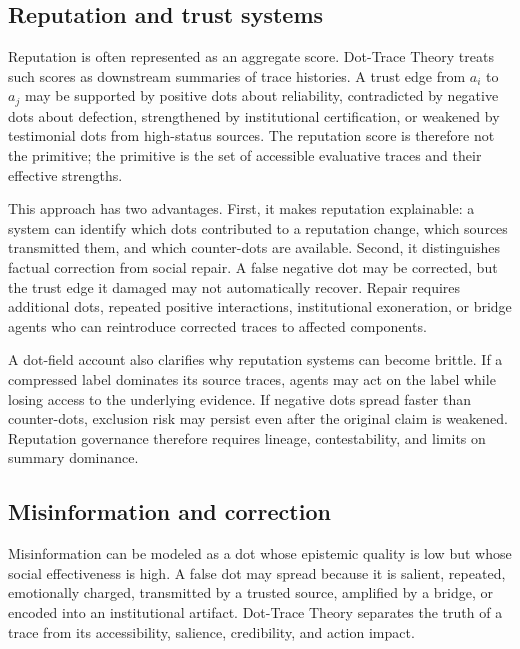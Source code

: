 \documentclass[11pt]{article}
\theoremstyle{remark}
\begin{document}
\subsection{Reputation and trust systems}\label{reputation-and-trust-systems}

Reputation is often represented as an aggregate score. Dot-Trace Theory treats such scores as downstream summaries of trace histories. A trust edge from $a_i$ to $a_j$ may be supported by positive dots about reliability, contradicted by negative dots about defection, strengthened by institutional certification, or weakened by testimonial dots from high-status sources. The reputation score is therefore not the primitive; the primitive is the set of accessible evaluative traces and their effective strengths.

This approach has two advantages. First, it makes reputation explainable: a system can identify which dots contributed to a reputation change, which sources transmitted them, and which counter-dots are available. Second, it distinguishes factual correction from social repair. A false negative dot may be corrected, but the trust edge it damaged may not automatically recover. Repair requires additional dots, repeated positive interactions, institutional exoneration, or bridge agents who can reintroduce corrected traces to affected components.

A dot-field account also clarifies why reputation systems can become brittle. If a compressed label dominates its source traces, agents may act on the label while losing access to the underlying evidence. If negative dots spread faster than counter-dots, exclusion risk may persist even after the original claim is weakened. Reputation governance therefore requires lineage, contestability, and limits on summary dominance.

\subsection{Misinformation and correction}\label{misinformation-and-correction}

Misinformation can be modeled as a dot whose epistemic quality is low but whose social effectiveness is high. A false dot may spread because it is salient, repeated, emotionally charged, transmitted by a trusted source, amplified by a bridge, or encoded into an institutional artifact. Dot-Trace Theory separates the truth of a trace from its accessibility, salience, credibility, and action impact.
\end{document}
